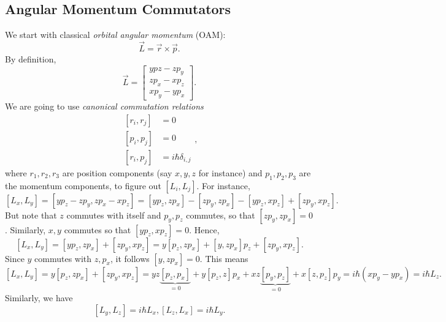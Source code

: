\documentclass[phys334]{subfiles}
\begin{document}
    \subsection{Angular Momentum Commutators}

    We start with classical \textit{orbital angular momentum} (OAM):
    \begin{equation*}
        \vec{L} = \vec{r}\times\vec{p}.
    \end{equation*}
    By definition,
    \begin{equation*}
        \vec{L} = \begin{bmatrix} ypz-zp_y \\ zp_x-xp_z \\ xp_y-yp_x \end{bmatrix}.
    \end{equation*}
    We are going to use \textit{canonical commutation relations}
    \begin{equation*}
        \begin{aligned}
            \left[ r_i,r_j \right] & = 0 \\
            \left[ p_i,p_j \right] & = 0 \\
            \left[ r_i,p_j \right] & = i\hbar\delta_{i,j}
        \end{aligned} ,
    \end{equation*}
    where $r_1,r_2,r_3$ are position components (say $x,y,z$ for instance) and $p_1,p_2,p_3$ are the momentum components, to figure out $\left[ L_i,L_j \right]$. For instance,
    \begin{equation*}
        \left[ L_x,L_y \right] = \left[ yp_z-zp_y,zp_x-xp_z \right] = \left[ yp_z,zp_x \right]-\left[ zp_y,zp_x \right]-\left[ yp_z,xp_z \right]+\left[ zp_y,xp_z \right].
    \end{equation*}
    But note that $z$ commutes with itself and $p_y,p_z$ commutes, so that $\left[ zp_y,zp_x \right]=0$. Similarly, $x,y$ commutes so that $\left[ yp_z,xp_z \right]=0$. Hence,
    \begin{equation*}
        \left[ L_x,L_y \right] = \left[ yp_z,zp_x \right] + \left[ zp_y,xp_z \right] = y\left[ p_z,zp_x \right]+\left[ y,zp_x \right]p_z + \left[ zp_y,xp_z \right].
    \end{equation*}
    Since $y$ commutes with $z,p_x$, it follows $\left[ y,zp_x \right]=0$. This means
    \begin{equation*}
        \left[ L_x,L_y \right] = y\left[ p_z,zp_x \right]+\left[ zp_y,xp_z \right] = yz\underbrace{\left[ p_z,p_x \right]}_{=0} + y\left[ p_z,z \right]p_x+xz\underbrace{\left[ p_y,p_z \right]}_{=0}+x\left[ z,p_z \right]p_y = i\hbar\left( xp_y-yp_x \right) = i\hbar L_z.
    \end{equation*}
    Similarly, we have
    \begin{equation*}
        \left[ L_y,L_z \right] = i\hbar L_x, \left[ L_z,L_x \right] = i\hbar L_y.
    \end{equation*}
\end{document}

